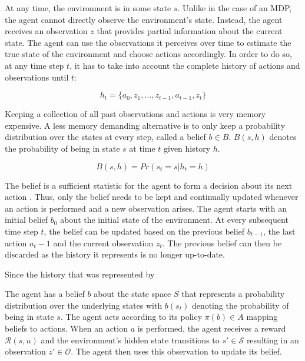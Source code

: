 At any time, the environment is in some state $s$. Unlike in the case of an MDP, the agent cannot directly observe the environment's state. Instead, the agent receives an observation $z$ that provides partial information about the current state. The agent can use the observations it perceives over time to estimate the true state of the environment and choose actions accordingly. In order to do so, at any time step $t$, it has to take into account the complete history of actions and observations until $t$:

\begin{equation}
    h_t = \{a_0,z_1,...,z_{t-1},a_{t-1},z_t\}
\end{equation}

Keeping a collection of all past observations and actions is very memory expensive. A less memory demanding alternative is to only keep a probability distribution over the states at every step, called a belief $b \in B$. $B(s,h)$ denotes the probability of being in state $s$ at time $t$ given history $h$. 

\begin{equation}
    B(s,h) = Pr(s_t=s|h_t=h)
\end{equation}

The belief is a sufficient statistic for the agent to form a decision about its next action \parencite{pomdp-belief}. Thus, only the belief needs to be kept and continually updated whenever an action is performed and a new observation arises. The agent starts with an initial belief $b_0$ about the initial state of the environment. At every subsequent time step $t$, the belief can be updated based on the previous belief $b_{t-1}$, the last action $a_t-1$ and the current observation $z_t$. The previous belief can then be discarded as the history it represents is no longer up-to-date.



Since the history that was represented by 

The agent has a belief $b$ about the state space $S$ that represents a probability distribution over the underlying states with $b(s_t)$ denoting the probability of being in state $s$. The agent acts according to its policy $\pi(b) \in A$ mapping beliefs to actions. When an action $a$ is performed, the agent receives a reward $\mathcal{R}(s,u)$ and the environment's hidden state transitions to $s' \in \mathcal{S}$ resulting in an observation $z' \in \mathcal{O}$. The agent then uses this observation to update its belief.

